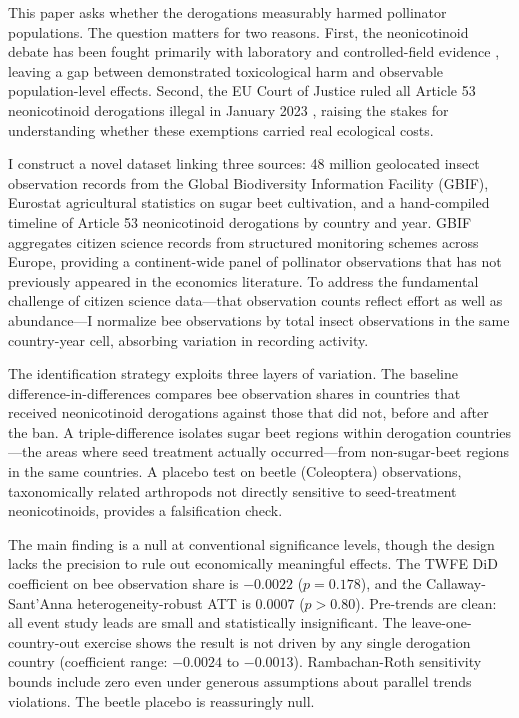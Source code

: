 \documentclass[12pt]{article}
\begin{document}
This paper asks whether the derogations measurably harmed pollinator populations. The question matters for two reasons. First, the neonicotinoid debate has been fought primarily with laboratory and controlled-field evidence \citep{woodcock2017, rundlof2015, henry2012}, leaving a gap between demonstrated toxicological harm and observable population-level effects. Second, the EU Court of Justice ruled all Article 53 neonicotinoid derogations illegal in January 2023 \citep{cjeu2023}, raising the stakes for understanding whether these exemptions carried real ecological costs.

I construct a novel dataset linking three sources: 48 million geolocated insect observation records from the Global Biodiversity Information Facility (GBIF), Eurostat agricultural statistics on sugar beet cultivation, and a hand-compiled timeline of Article 53 neonicotinoid derogations by country and year. GBIF aggregates citizen science records from structured monitoring schemes across Europe, providing a continent-wide panel of pollinator observations that has not previously appeared in the economics literature. To address the fundamental challenge of citizen science data---that observation counts reflect effort as well as abundance---I normalize bee observations by total insect observations in the same country-year cell, absorbing variation in recording activity.

The identification strategy exploits three layers of variation. The baseline difference-in-differences compares bee observation shares in countries that received neonicotinoid derogations against those that did not, before and after the ban. A triple-difference isolates sugar beet regions within derogation countries---the areas where seed treatment actually occurred---from non-sugar-beet regions in the same countries. A placebo test on beetle (Coleoptera) observations, taxonomically related arthropods not directly sensitive to seed-treatment neonicotinoids, provides a falsification check.

The main finding is a null at conventional significance levels, though the design lacks the precision to rule out economically meaningful effects. The TWFE DiD coefficient on bee observation share is $-0.0022$ ($p = 0.178$), and the Callaway-Sant'Anna heterogeneity-robust ATT is $0.0007$ ($p > 0.80$). Pre-trends are clean: all event study leads are small and statistically insignificant. The leave-one-country-out exercise shows the result is not driven by any single derogation country (coefficient range: $-0.0024$ to $-0.0013$). Rambachan-Roth sensitivity bounds include zero even under generous assumptions about parallel trends violations. The beetle placebo is reassuringly null.
\end{document}
